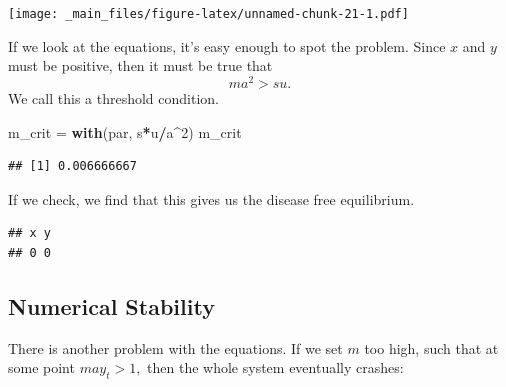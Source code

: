\documentclass[
]{book}
\newenvironment{Shaded}{\begin{snugshade}}{\end{snugshade}}
\newcommand{\AttributeTok}[1]{\textcolor[rgb]{0.13,0.29,0.53}{#1}}
\newcommand{\DecValTok}[1]{\textcolor[rgb]{0.00,0.00,0.81}{#1}}
\newcommand{\FunctionTok}[1]{\textcolor[rgb]{0.13,0.29,0.53}{\textbf{#1}}}
\newcommand{\NormalTok}[1]{#1}
\newcommand{\OtherTok}[1]{\textcolor[rgb]{0.56,0.35,0.01}{#1}}
\newcommand{\SpecialCharTok}[1]{\textcolor[rgb]{0.81,0.36,0.00}{\textbf{#1}}}
\begin{document}
\texttt{[image: \_main\_files/figure-latex/unnamed-chunk-21-1.pdf]}

If we look at the equations, it's easy enough to spot the problem. Since \(x\) and \(y\) must be positive, then it must be true that \[m a^2 > su.\] We call this a threshold condition.

\begin{Shaded}
\begin{Highlighting}[]
\NormalTok{m\_crit }\OtherTok{=} \FunctionTok{with}\NormalTok{(par, s}\SpecialCharTok{*}\NormalTok{u}\SpecialCharTok{/}\NormalTok{a}\SpecialCharTok{\^{}}\DecValTok{2}\NormalTok{)}
\NormalTok{m\_crit }
\end{Highlighting}
\end{Shaded}

\begin{verbatim}
## [1] 0.006666667
\end{verbatim}

If we check, we find that this gives us the disease free equilibrium.

\begin{Shaded}
\end{Shaded}

\begin{verbatim}
## x y 
## 0 0
\end{verbatim}

\subsection{Numerical Stability}\label{numerical-stability}

There is another problem with the equations. If we set \(m\) too high, such that at some point \(m a y_t > 1,\) then the whole system eventually crashes:

\begin{Shaded}
\end{Shaded}
\end{document}
